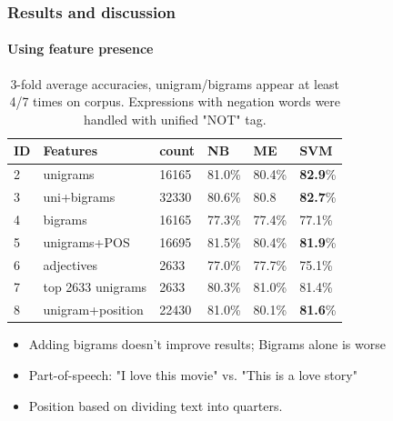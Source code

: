 \documentclass{beamer}
\begin{document}
\begin{frame}
	\frametitle{Results and discussion}
	\framesubtitle{Using feature presence}
	\begin{center}
		\begin{table}
			\begin{tabular}{l | l | l || l | l | l}
				ID & Features & count & NB & ME & SVM \\ \hline \hline
				2 & unigrams & 16165 & 81.0\% & 80.4\% & \textbf{82.9}\% \\
				3 & uni+bigrams & 32330 & 80.6\% & 80.8 & \textbf{82.7}\% \\
				4 & bigrams & 16165 & 77.3\% & 77.4\% & 77.1\% \\ \hline \hline
				5 & unigrams+POS & 16695 & 81.5\% & 80.4\% & \textbf{81.9}\% \\
				6 & adjectives & 2633 & 77.0\% & 77.7\% & 75.1\% \\
				7 & top 2633 unigrams & 2633 & 80.3\% & 81.0\% & 81.4\% \\
				8 & unigram+position & 22430 & 81.0\% & 80.1\% & \textbf{81.6}\% \\
			\end{tabular}
			\caption{3-fold average accuracies, unigram/bigrams appear at least 4/7 times on corpus. Expressions with negation words were handled with unified "NOT" tag. }
		\end{table}
	\end{center}
	\pause
	\begin{itemize}
		\item Adding bigrams doesn't improve results; Bigrams alone is worse
		\item Part-of-speech: "I love this movie" vs. "This is a love story"
		\item Position based on dividing text into quarters.
	\end{itemize}
\end{frame}
\end{document}
